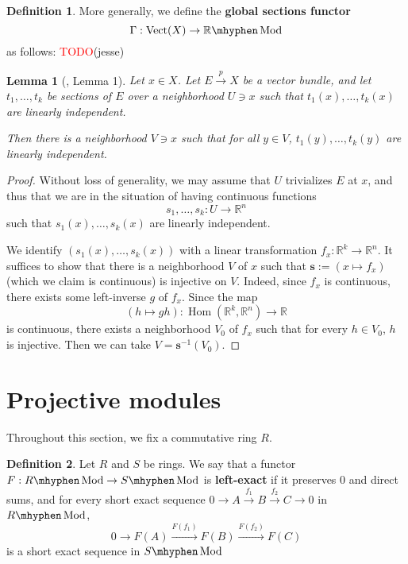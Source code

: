 \documentclass[11pt]{article}
\newcommand{\R}{\mathbb{R}}
\newcommand{\remph}[1]{\textcolor{red}{#1}}
\newcommand{\TODO}{\remph{TODO}}
\newcommand{\Hom}{\operatorname{Hom}}
\newcommand{\Vect}{\operatorname{Vect}}
\newcommand{\Mod}{\mhyphen\operatorname{Mod}}
\theoremstyle{plain}
\newtheorem{lemma}{Lemma}[section]
\theoremstyle{definition}
\newtheorem{definition}{Definition}[section]
\begin{document}
\begin{definition}\label{def-global-sections-functor}
  More generally, we define the \textbf{global sections functor}
  \[\Gamma : \Vect(X) \to \R\Mod\]
  as follows:
  \TODO(jesse)
\end{definition}

\begin{lemma}[\cite{swan1962vector}, Lemma 1]\label{lemma-1}
  Let \(x \in X\). Let \(E \overset{p}{\to} X\) be a vector bundle, and let \(t_1, \dots, t_k\) be sections of \(E\) over a neighborhood \(U \ni x\) such that \(t_1(x), \dots, t_k(x)\) are linearly independent.

  Then there is a neighborhood \(V \ni x\) such that for all \(y \in V\), \(t_1(y), \dots, t_k(y)\) are linearly independent.
\end{lemma}

\begin{proof}
  Without loss of generality, we may assume that \(U\) trivializes \(E\) at \(x\), and thus that we are in the situation of having continuous functions
  \[s_1, \dots, s_k : U \to \R^n\]
  such that \(s_1(x), \dots, s_k(x)\) are linearly independent.
  
  We identify \((s_1(x), \dots, s_k(x))\) with a linear transformation \(f_x : \R^k \to \R^n\). It suffices to show that there is a neighborhood \(V\) of \(x\) such that \(\mathbf{s} := (x \mapsto f_x)\) (which we claim is continuous) is injective on \(V\). Indeed, since \(f_x\) is continuous, there exists some left-inverse \(g\) of \(f_x\). Since the map
  \[(h \mapsto gh) : \Hom(\R^k, \R^n) \to \R\]
  is continuous, there exists a neighborhood \(V_0\) of \(f_x\) such that for every \(h \in V_0\), \(h\) is injective. Then we can take \(V = \mathbf{s}^{-1}(V_0)\).
\end{proof}

\section{Projective modules}
Throughout this section, we fix a commutative ring \(R\).

\begin{definition} \label{def-left-exact}
  Let \(R\) and \(S\) be rings. We say that a functor \(F : R\Mod \to S\Mod\) is \textbf{left-exact} if it preserves \(0\) and direct sums, and for every short exact sequence \(0 \to A \overset{f_1}{\to} B \overset{f_2}{\to} C \to 0\) in \(R\Mod\),
  \[0 \to F(A) \overset{F(f_1)}{\to} F(B) \overset{F(f_2)}{\to} F(C)\]
  is a short exact sequence in \(S\Mod\)
\end{definition}
\end{document}
